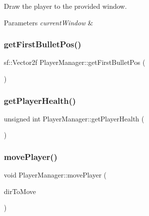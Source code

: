 Draw the player to the provided window. 


\begin{DoxyParams}{Parameters}
{\em current\+Window} & \\
\hline
\end{DoxyParams}
\mbox{\label{class_player_manager_a1e058a4c38ae4b17a8541feb40247d06}} 
\subsubsection{\texorpdfstring{get\+First\+Bullet\+Pos()}{getFirstBulletPos()}}
{\footnotesize\ttfamily sf\+::\+Vector2f Player\+Manager\+::get\+First\+Bullet\+Pos (\begin{DoxyParamCaption}{ }\end{DoxyParamCaption})\hspace{0.3cm}{\ttfamily [inline]}}

\mbox{\label{class_player_manager_a1e1d29acf1a54f18fafe6a2a91c67ee7}} 
\subsubsection{\texorpdfstring{get\+Player\+Health()}{getPlayerHealth()}}
{\footnotesize\ttfamily unsigned int Player\+Manager\+::get\+Player\+Health (\begin{DoxyParamCaption}{ }\end{DoxyParamCaption})\hspace{0.3cm}{\ttfamily [inline]}}

\mbox{\label{class_player_manager_a95358a4f97cf343f5d5d01a440c5dc76}} 
\subsubsection{\texorpdfstring{move\+Player()}{movePlayer()}}
{\footnotesize\ttfamily void Player\+Manager\+::move\+Player (\begin{DoxyParamCaption}\item[{\hyperlink{_player_manager_8h_a00ec4eba48da32d6cbdf827185fd3d34}{Move\+Direction}}]{dir\+To\+Move }\end{DoxyParamCaption})}



